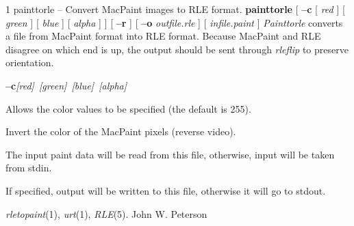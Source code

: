 %
%
%
 1
painttorle -- Convert MacPaint images to RLE format.
{\bf painttorle}
[
{\bf --c}
[
{\it red}
] [
{\it green}
] [
{\it blue}
] [
{\it alpha}
] ] [
{\bf --r}
] [
{\bf --o}
{\it outfile.rle}
] [
{\it infile.paint}
]
{\it Painttorle}
converts a file from MacPaint format into RLE format.  Because MacPaint and
RLE disagree on which end is up, the output should be sent through
{\it rleflip}
to preserve orientation. 
\begin{TPlist}{{\bf --c}{\it [red]\ [green]\ [blue]\ [alpha]}
}
\item[{{\bf --c}{\it [red]\ [green]\ [blue]\ [alpha]}
}]
Allows the color values to be specified (the default is 255).
\item[{{\bf --r}}]
Invert the color of the MacPaint pixels (reverse video).
\item[{{\it infile.paint}}]
The input paint data will be read from this file, otherwise, input will
be taken from stdin.
\item[{{\bf --o}{\it \ outfile.rle}
}]
If specified, output will be written to this file, otherwise it will
go to stdout.
\end{TPlist}
{\it rletopaint}{\rm (1),}
{\it urt}{\rm (1),}
{\it RLE}{\rm (5).}
John W. Peterson
\newpage


